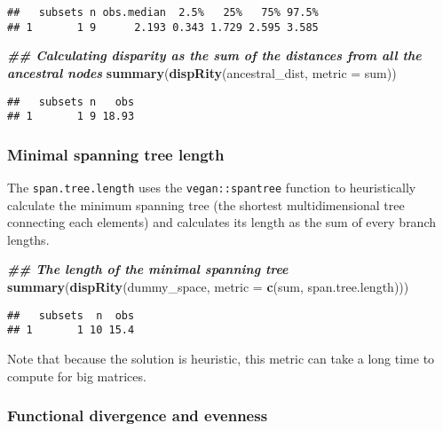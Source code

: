 \documentclass[
]{book}
\newenvironment{Shaded}{\begin{snugshade}}{\end{snugshade}}
\newcommand{\AttributeTok}[1]{\textcolor[rgb]{0.13,0.29,0.53}{#1}}
\newcommand{\DocumentationTok}[1]{\textcolor[rgb]{0.56,0.35,0.01}{\textbf{\textit{#1}}}}
\newcommand{\FunctionTok}[1]{\textcolor[rgb]{0.13,0.29,0.53}{\textbf{#1}}}
\newcommand{\NormalTok}[1]{#1}
\begin{document}
\begin{verbatim}
##   subsets n obs.median  2.5%   25%   75% 97.5%
## 1       1 9      2.193 0.343 1.729 2.595 3.585
\end{verbatim}

\begin{Shaded}
\begin{Highlighting}[]
\DocumentationTok{\#\# Calculating disparity as the sum of the distances from all the ancestral nodes}
\FunctionTok{summary}\NormalTok{(}\FunctionTok{dispRity}\NormalTok{(ancestral\_dist, }\AttributeTok{metric =}\NormalTok{ sum))}
\end{Highlighting}
\end{Shaded}

\begin{verbatim}
##   subsets n   obs
## 1       1 9 18.93
\end{verbatim}

\hypertarget{minimal-spanning-tree-length}{%
\subsubsection{Minimal spanning tree length}\label{minimal-spanning-tree-length}}

The \texttt{span.tree.length} uses the \texttt{vegan::spantree} function to heuristically calculate the minimum spanning tree (the shortest multidimensional tree connecting each elements) and calculates its length as the sum of every branch lengths.

\begin{Shaded}
\begin{Highlighting}[]
\DocumentationTok{\#\# The length of the minimal spanning tree}
\FunctionTok{summary}\NormalTok{(}\FunctionTok{dispRity}\NormalTok{(dummy\_space, }\AttributeTok{metric =} \FunctionTok{c}\NormalTok{(sum, span.tree.length)))}
\end{Highlighting}
\end{Shaded}

\begin{verbatim}
##   subsets  n  obs
## 1       1 10 15.4
\end{verbatim}

Note that because the solution is heuristic, this metric can take a long time to compute for big matrices.

\hypertarget{functional-divergence-and-evenness}{%
\subsubsection{Functional divergence and evenness}\label{functional-divergence-and-evenness}}
\end{document}
